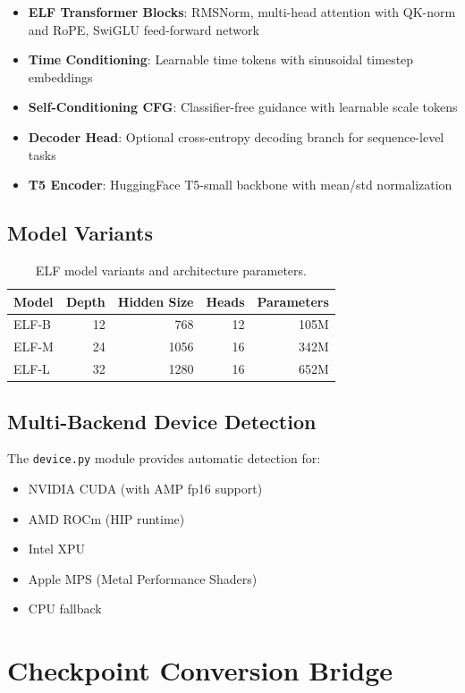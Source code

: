\documentclass[11pt]{article}
\begin{document}
\begin{itemize}
\item \textbf{ELF Transformer Blocks}: RMSNorm, multi-head attention with QK-norm and RoPE,
      SwiGLU feed-forward network
\item \textbf{Time Conditioning}: Learnable time tokens with sinusoidal timestep embeddings
\item \textbf{Self-Conditioning CFG}: Classifier-free guidance with learnable scale tokens
\item \textbf{Decoder Head}: Optional cross-entropy decoding branch for sequence-level tasks
\item \textbf{T5 Encoder}: HuggingFace T5-small backbone with mean/std normalization
\end{itemize}

\subsection{Model Variants}

\begin{table}[h]
\centering
\begin{tabular}{lrrrr}
\toprule
Model & Depth & Hidden Size & Heads & Parameters \\
\midrule
ELF-B & 12 & 768 & 12 & 105M \\
ELF-M & 24 & 1056 & 16 & 342M \\
ELF-L & 32 & 1280 & 16 & 652M \\
\bottomrule
\end{tabular}
\caption{ELF model variants and architecture parameters.}
\end{table}

\subsection{Multi-Backend Device Detection}

The \texttt{device.py} module provides automatic detection for:
\begin{itemize}
\item NVIDIA CUDA (with AMP fp16 support)
\item AMD ROCm (HIP runtime)
\item Intel XPU
\item Apple MPS (Metal Performance Shaders)
\item CPU fallback
\end{itemize}

\section{Checkpoint Conversion Bridge}
\end{document}
